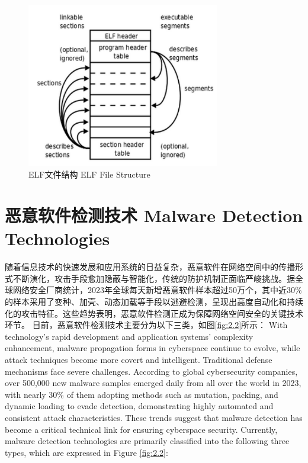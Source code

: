 \begin{figure}[hbt]
	\centering
	\includegraphics[width=0.75\textwidth]{figures/2.1}
	\caption{ELF文件结构 ELF File Structure}\label{fig:2.1}
\end{figure}

\section{恶意软件检测技术 Malware Detection Technologies}

随着信息技术的快速发展和应用系统的日益复杂，恶意软件在网络空间中的传播形式不断演化，攻击手段愈加隐蔽与智能化，传统的防护机制正面临严峻挑战。据全球网络安全厂商统计，2023年全球每天新增恶意软件样本超过50万个，其中近30\%的样本采用了变种、加壳、动态加载等手段以逃避检测，呈现出高度自动化和持续化的攻击特征。这些趋势表明，恶意软件检测正成为保障网络空间安全的关键技术环节。
目前，恶意软件检测技术主要分为以下三类，如图\ref{fig:2.2}所示：
With technology's rapid development and application systems' complexity enhancement, malware propagation forms in cyberspace continue to evolve, while attack techniques become more covert and intelligent. Traditional defense mechanisms face severe challenges. According to global cybersecurity companies, over 500,000 new malware samples emerged daily from all over the world in 2023, with nearly 30\% of them adopting methods such as mutation, packing, and dynamic loading to evade detection, demonstrating highly automated and consistent attack characteristics. These trends suggest that malware detection has become a critical technical link for ensuring cyberspace security.
Currently, malware detection technologies are primarily classified into the following three types, which are expressed in Figure \ref{fig:2.2}:

